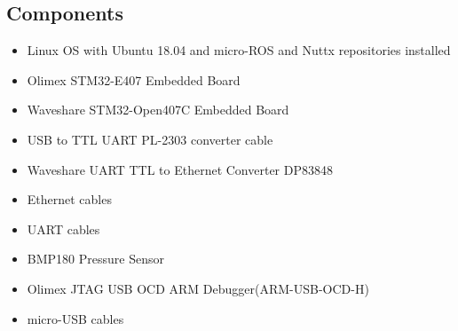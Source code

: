 \documentclass[%
xelatex,
	oneside,		%
	12pt,			%
	parskip=half,	%
	abstracton,
	chapterprefix=true%
    appendixprefix=true]
{scrbook}
\begin{document}
	\subsection{Components}
	\vspace*{0.5cm}
	\begin{itemize}
	\item Linux OS with Ubuntu 18.04 and micro-ROS and Nuttx repositories installed
	\item Olimex STM32-E407 Embedded Board
	\item Waveshare STM32-Open407C Embedded Board
	\item USB to TTL UART PL-2303 converter cable
	\item Waveshare UART TTL to Ethernet Converter DP83848
	\item Ethernet cables
	\item UART cables
	\item BMP180 Pressure Sensor
	\item Olimex JTAG USB OCD ARM Debugger(ARM-USB-OCD-H)
	\item micro-USB cables
	\end{itemize}
\end{document}
